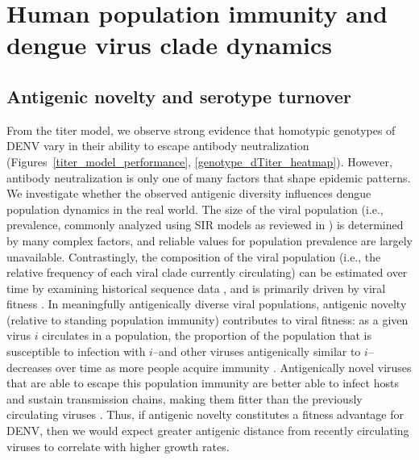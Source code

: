 
\chapter{Human population immunity and dengue virus clade dynamics}
\section{Antigenic novelty and serotype turnover}
From the titer model, we observe strong evidence that homotypic genotypes of DENV vary in their ability to escape antibody neutralization (Figures~\ref{titer_model_performance}, \ref{genotype_dTiter_heatmap}).
However, antibody neutralization is only one of many factors that shape epidemic patterns.
We investigate whether the observed antigenic diversity influences dengue population dynamics in the real world.
The size of the viral population (i.e., prevalence, commonly analyzed using SIR models as reviewed in \citep{lourencco2018challenges}) is determined by many complex factors, and reliable values for population prevalence are largely unavailable.
Contrastingly, the composition of the viral population (i.e., the relative frequency of each viral clade currently circulating) can be estimated over time by examining historical sequence data \citep{lee2018deep,neher2016prediction}, and is primarily driven by viral fitness \citep{bedford2011strength}.
In meaningfully antigenically diverse viral populations, antigenic novelty (relative to standing population immunity) contributes to viral fitness: as a given virus $i$ circulates in a population, the proportion of the population that is susceptible to infection with $i$--and other viruses antigenically similar to $i$--decreases over time as more people acquire immunity \citep{bedford2012canalization, luksza2014predictive}.
Antigenically novel viruses that are able to escape this population immunity are better able to infect hosts and sustain transmission chains, making them fitter than the previously circulating viruses \citep{zhang2005clade, bedford2012canalization}.
Thus, if antigenic novelty constitutes a fitness advantage for DENV, then we would expect greater antigenic distance from recently circulating viruses to correlate with higher growth rates.

